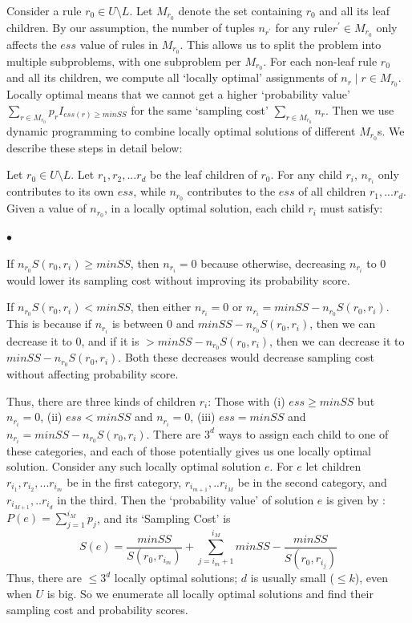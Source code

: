 \documentclass[10pt,journal,compsoc]{IEEEtran}
\newcounter{prob}
\newcommand{\squishlist}{
   \begin{list}{$\bullet$}
    { \setlength{\itemsep}{0pt}
      \setlength{\parsep}{2pt}
      \setlength{\topsep}{2pt}
      \setlength{\partopsep}{0pt}
    }
}
\newcommand{\squishend}{\end{list}}
\newcommand{\papertext}[1]{#1}
\begin{document}
\papertext{
Consider a rule $r_0 \in U \setminus L$. Let $M_{r_0}$ denote the set containing $r_0$ and all its leaf children. By our assumption, the number of tuples $n_{r^{\prime}}$ for any rule$r^{\prime} \in M_{r_0}$ only affects the $ess$ value of rules in $M_{r_0}$. This allows us to split the problem into multiple subproblems,  with one subproblem per $M_{r_0}$. For each non-leaf rule $r_0$ and all its children, we compute all `locally optimal' assignments of $n_r \mid r \in M_{r_0}$. Locally optimal means that we cannot get a higher `probability value' $\sum_{r \in M_{r_0}} p_rI_{ess(r) \geq minSS}$ for the same `sampling cost' $\sum_{r\in M_{r_0}} n_r$. Then we use dynamic programming to combine locally optimal solutions of different $M_{r_0}$s. We describe these steps in detail below:

Let $r_0 \in U \setminus L$. Let $r_1, r_2, ... r_d$ be the leaf children of $r_0$. For any child $r_i$, $n_{r_i}$ only contributes to its own $ess$, while $n_{r_0}$ contributes to the $ess$ of all children $r_1, ... r_d$. Given a value of $n_{r_0}$, in a locally optimal solution, each child $r_i$ must satisfy:
\squishlist
\item If $n_{r_0}S(r_0, r_i) \geq minSS$, then $n_{r_i} = 0$ because otherwise, decreasing $n_{r_i}$ to $0$ would lower its sampling cost without improving its probability score. 
\item If $n_{r_0}S(r_0, r_i) < minSS$, then either $n_{r_i} = 0$ or $n_{r_i} = minSS - n_{r_0}S(r_0, r_i)$. This is because if $n_{r_i}$ is between $0$ and $minSS - n_{r_0}S(r_0, r_i)$, then we can decrease it to $0$, and if it is $> minSS - n_{r_0}S(r_0, r_i)$, then we can decrease it to $minSS - n_{r_0}S(r_0, r_i)$. Both these decreases would decrease sampling cost without affecting probability score. 
\squishend
Thus, there are three kinds of children $r_i$: Those with (i) $ess \geq minSS$ but $n_{r_i} = 0$, (ii) $ess < minSS$ and $n_{r_i} = 0$, (iii) $ess = minSS$ and $n_{r_i} = minSS - n_{r_0}S(r_0, r_i)$. There are $3^d$ ways to assign each child to one of these categories, and each of those potentially gives us one locally optimal solution. Consider any such locally optimal solution $e$. For $e$ let children $r_{i_1}, r_{i_2}, ... r_{i_m}$ be in the first category, $r_{i_{m+1}}, .. r_{i_M}$ be in the second category, and $r_{i_{M+1}}, .. r_{i_d}$ in the third.  Then the `probability value' of solution $e$ is given by : 
$P(e) = \sum_{j = 1}^{i_M}p_{j}$,
and its `Sampling Cost' is
$$S(e) = \frac{minSS}{S(r_0, r_{i_m})} + \sum_{j=i_m+1}^{i_M} minSS - \frac{minSS}{S(r_0, r_{i_j})}$$
Thus, there are $\leq 3^d$ locally optimal solutions; $d$ is usually small ($\leq k$), even when $U$ is big. So we enumerate all locally optimal solutions and find their sampling cost and probability scores.

}
\end{document}
